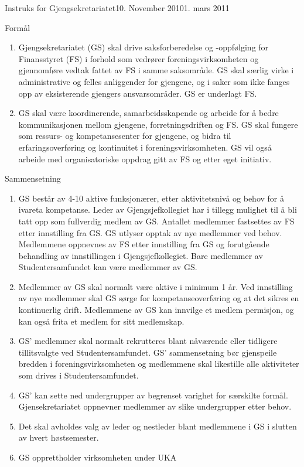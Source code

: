 \documentclass[../fsbok.tex]{subfiles}
\begin{document}
\begin{instruks}{Instruks for Gjengsekretariatet}{10. November 2010}{1. mars 2011}

    \begin{instruksledd}{Formål}
        \begin{enumerate}
            \item Gjengsekretariatet (GS) skal drive saksforberedelse og -oppfølging for Finansstyret (FS) i forhold som vedrører
foreningsvirksomheten og gjennomføre vedtak fattet av FS i samme saksområde. GS
skal særlig virke i administrative og felles anliggender for gjengene, og i saker som ikke fanges opp av
eksisterende gjengers ansvarsområder. GS er underlagt FS.
            \item  GS skal være koordinerende, samarbeidsskapende og arbeide for å bedre kommunikasjonen
mellom gjengene, forretningsdriften og FS. GS skal fungere som ressurs- og
kompetansesenter for gjengene, og bidra til erfaringsoverføring og kontinuitet i foreningsvirksomheten.
GS vil også arbeide med organisatoriske oppdrag gitt av FS og etter eget initiativ.
        \end{enumerate}
    \end{instruksledd}

    \begin{instruksledd}{Sammensetning}
        \begin{enumerate}
            \item GS består av 4-10 aktive funksjonærer, etter aktivitetsnivå og behov for å ivareta kompetanse. Leder av Gjengsjefkollegiet har i tillegg mulighet til å bli tatt opp som fullverdig medlem av GS.  
Antallet medlemmer fastsettes av FS etter innstilling fra GS. GS
utlyser opptak av nye medlemmer ved behov. Medlemmene oppnevnes av FS etter innstilling fra
GS og forutgående behandling av innstillingen i Gjengsjefkollegiet. Bare medlemmer av
Studentersamfundet kan være medlemmer av GS.
            \item Medlemmer av GS skal normalt være aktive i minimum 1 år. Ved innstilling av nye
medlemmer skal GS sørge for kompetanseoverføring og at det sikres en kontinuerlig drift.
Medlemmene av GS kan innvilge et medlem permisjon, og kan også frita et medlem for sitt
medlemskap.
            \item  GS' medlemmer skal normalt rekrutteres blant nåværende eller tidligere tillitsvalgte ved
Studentersamfundet. GS' sammensetning bør gjenspeile bredden i foreningsvirksomheten og
medlemmene skal likestille alle aktiviteter som drives i Studentersamfundet.
            \item GS' kan sette ned undergrupper av begrenset varighet for særskilte formål. Gjensekretariatet
oppnevner medlemmer av slike undergrupper etter behov.
        \item Det skal avholdes valg av leder og nestleder blant medlemmene i GS i slutten av hvert høstsemester.
            \item GS opprettholder virksomheten under UKA
        \end{enumerate}
    \end{instruksledd}


\end{instruks}
\end{document}
